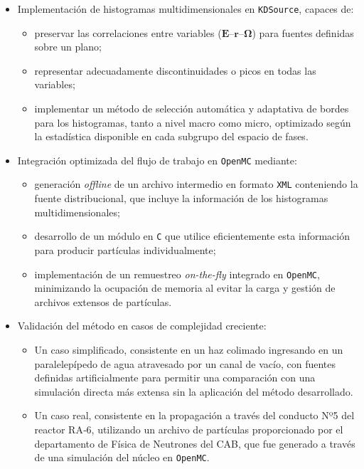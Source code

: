 \begin{itemize}
    \item Implementación de histogramas multidimensionales en \texttt{KDSource}, capaces de:
    \begin{itemize}
        \item preservar las correlaciones entre variables ($\mathbf{E}$–$\mathbf{r}$–$\boldsymbol{\Omega}$) para fuentes definidas sobre un plano;
        \item representar adecuadamente discontinuidades o picos en todas las variables;
        \item implementar un método de selección automática y adaptativa de bordes para los histogramas, tanto a nivel macro como micro, optimizado según la estadística disponible en cada subgrupo del espacio de fases.
    \end{itemize}

    \item Integración optimizada del flujo de trabajo en \texttt{OpenMC} mediante:
    \begin{itemize}
        \item generación \emph{offline} de un archivo intermedio en formato \texttt{XML} conteniendo la fuente distribucional, que incluye la información de los histogramas multidimensionales;
        \item desarrollo de un módulo en \texttt{C} que utilice eficientemente esta información para producir partículas individualmente;
        \item implementación de un remuestreo \emph{on-the-fly} integrado en \texttt{OpenMC}, minimizando la ocupación de memoria al evitar la carga y gestión de archivos extensos de partículas.
    \end{itemize}

    \item Validación  del método en casos de complejidad creciente:
    \begin{itemize}
        \item Un caso simplificado, consistente en un haz colimado ingresando en un paralelepípedo de agua atravesado por un canal de vacío, con fuentes definidas artificialmente para permitir una comparación con una simulación directa más extensa sin la aplicación del método desarrollado. 
        \item Un caso real, consistente en la propagación a través del conducto Nº5 del reactor RA‑6, utilizando un archivo de partículas proporcionado por el departamento de Física de Neutrones del CAB, que fue generado a través de una simulación del núcleo en \texttt{OpenMC}.
    \end{itemize}
\end{itemize}
